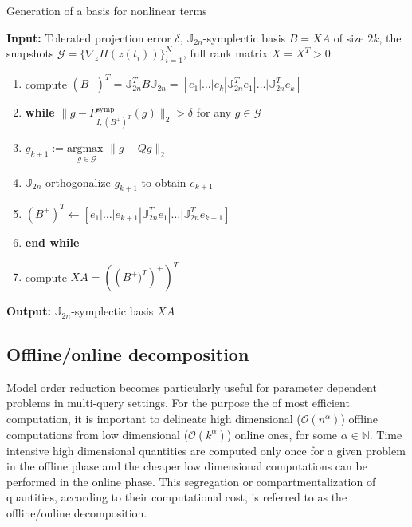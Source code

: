 \begin{algorithm} 
\caption{Generation of a basis for nonlinear terms} \label{alg:3}
{\bf Input:} Tolerated projection error $\delta$, $\mathbb J_{2n}$-symplectic basis $B = X A$ of size $2k$, the snapshots $\mathcal G = \{ \nabla_zH(z(t_i))\}_{i=1}^{N}$, full rank matrix $X=X^T>0$
\begin{enumerate}
\item compute $(B^+)^T = \mathbb J_{2n}^T B \mathbb J_{2n} = [e_1|\dots |e_{k} | \mathbb J_{2n}^Te_1|\dots| \mathbb J_{2n}^Te_{k}]$
\item \textbf{while} $\| g - P_{I,(B^+)^T}^{\text{symp}} (g) \|_2 > \delta$ for any $g \in \mathcal G$
\item \hspace{0.5cm} $g_{k+1} := \underset{g\in \mathcal G}{\text{argmax }} \| g -  Q g  \|_2$
\item \hspace{0.5cm} $\mathbb J_{2n}$-orthogonalize $g_{k+1}$ to obtain $e_{k+1}$
\item \hspace{0.5cm} $(B^+)^T \leftarrow [e_1|\dots |e_{k+1} | \mathbb J_{2n}^Te_1|\dots| \mathbb J_{2n}^Te_{k+1}]$
\item \textbf{end while}
\item compute $XA = \left( \left (B^+)^T \right)^+ \right)^T$
\end{enumerate}
\vspace{0.5cm}
{\bf Output:} $\mathbb J_{2n}$-symplectic basis $XA$
\end{algorithm}

\subsection{Offline/online decomposition} \label{sec:normmor.4}
Model order reduction becomes particularly useful for parameter dependent problems in multi-query settings. For the purpose the of most efficient computation, it is important to delineate high dimensional ($\mathcal{O}(n^{\alpha})$) offline computations from low dimensional ($\mathcal{O}(k^{\alpha})$) online ones, for some $\alpha \in \mathbb N$. Time intensive high dimensional quantities are computed only once for a given problem in the offline phase and the cheaper low dimensional computations can be performed in the online phase. This segregation or compartmentalization of quantities, according to their computational cost, is referred to as the offline/online decomposition.

